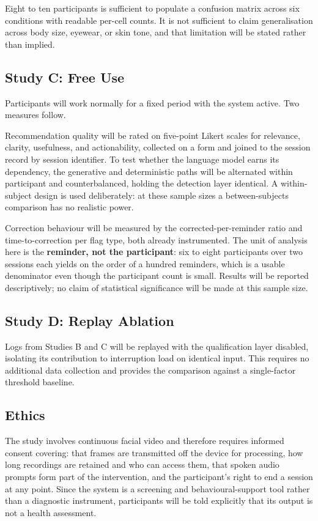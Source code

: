 Eight to ten participants is sufficient to populate a confusion matrix across six conditions with
readable per-cell counts. It is not sufficient to claim generalisation across body size, eyewear,
or skin tone, and that limitation will be stated rather than implied.

\subsection{Study C: Free Use}

Participants will work normally for a fixed period with the system active. Two measures follow.

Recommendation quality will be rated on five-point Likert scales for relevance, clarity,
usefulness, and actionability, collected on a form and joined to the session record by session
identifier. To test whether the language model earns its dependency, the generative and
deterministic paths will be alternated within participant and counterbalanced, holding the
detection layer identical. A within-subject design is used deliberately: at these sample sizes a
between-subjects comparison has no realistic power.

Correction behaviour will be measured by the corrected-per-reminder ratio and time-to-correction
per flag type, both already instrumented. The unit of analysis here is the \textbf{reminder, not
the participant}: six to eight participants over two sessions each yields on the order of a hundred
reminders, which is a usable denominator even though the participant count is small. Results will
be reported descriptively; no claim of statistical significance will be made at this sample size.

\subsection{Study D: Replay Ablation}

Logs from Studies B and C will be replayed with the qualification layer disabled, isolating its
contribution to interruption load on identical input. This requires no additional data collection
and provides the comparison against a single-factor threshold baseline.

\subsection{Ethics}

The study involves continuous facial video and therefore requires informed consent covering: that
frames are transmitted off the device for processing, how long recordings are retained and who can
access them, that spoken audio prompts form part of the intervention, and the participant's right
to end a session at any point. Since the system is a screening and behavioural-support tool rather
than a diagnostic instrument, participants will be told explicitly that its output is not a health
assessment.
